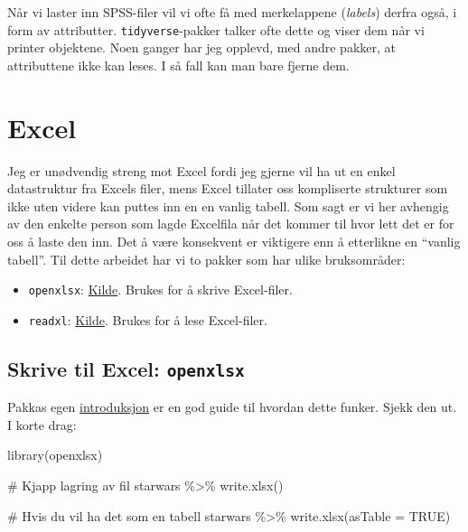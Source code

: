 \documentclass[
  letterpaper,
  DIV=11,
  numbers=noendperiod]{scrreprt}
\newenvironment{Shaded}{\begin{snugshade}}{\end{snugshade}}
\newcommand{\AttributeTok}[1]{\textcolor[rgb]{0.40,0.45,0.13}{#1}}
\newcommand{\CommentTok}[1]{\textcolor[rgb]{0.37,0.37,0.37}{#1}}
\newcommand{\ConstantTok}[1]{\textcolor[rgb]{0.56,0.35,0.01}{#1}}
\newcommand{\FunctionTok}[1]{\textcolor[rgb]{0.28,0.35,0.67}{#1}}
\newcommand{\NormalTok}[1]{\textcolor[rgb]{0.00,0.23,0.31}{#1}}
\newcommand{\SpecialCharTok}[1]{\textcolor[rgb]{0.37,0.37,0.37}{#1}}
\providecommand{\tightlist}{%
  \setlength{\itemsep}{0pt}\setlength{\parskip}{0pt}}\usepackage{longtable,booktabs,array}
\begin{document}
Når vi laster inn SPSS-filer vil vi ofte få med merkelappene
(\emph{labels}) derfra også, i form av attributter.
\texttt{tidyverse}-pakker talker ofte dette og viser dem når vi printer
objektene. Noen ganger har jeg opplevd, med andre pakker, at
attributtene ikke kan leses. I så fall kan man bare fjerne dem.

\hypertarget{excel-1}{%
\section{Excel}\label{excel-1}}

Jeg er unødvendig streng mot Excel fordi jeg gjerne vil ha ut en enkel
datastruktur fra Excels filer, mens Excel tillater oss kompliserte
strukturer som ikke uten videre kan puttes inn en en vanlig tabell. Som
sagt er vi her avhengig av den enkelte person som lagde Excelfila når
det kommer til hvor lett det er for oss å laste den inn. Det å være
konsekvent er viktigere enn å etterlikne en ``vanlig tabell''. Til dette
arbeidet har vi to pakker som har ulike bruksområder:

\begin{itemize}
\tightlist
\item
  \texttt{openxlsx}: \href{https://ycphs.github.io/openxlsx/}{Kilde}.
  Brukes for å skrive Excel-filer.
\item
  \texttt{readxl}: \href{https://readxl.tidyverse.org/}{Kilde}. Brukes
  for å lese Excel-filer.
\end{itemize}

\hypertarget{skrive-til-excel-openxlsx}{%
\subsection{\texorpdfstring{Skrive til Excel:
\texttt{openxlsx}}{Skrive til Excel: openxlsx}}\label{skrive-til-excel-openxlsx}}

Pakkas egen
\href{https://ycphs.github.io/openxlsx/articles/Introduction.html}{introduksjon}
er en god guide til hvordan dette funker. Sjekk den ut. I korte drag:

\begin{Shaded}
\begin{Highlighting}[]
\FunctionTok{library}\NormalTok{(openxlsx)}

\CommentTok{\# Kjapp lagring av fil}
\NormalTok{starwars }\SpecialCharTok{\%\textgreater{}\%} \FunctionTok{write.xlsx}\NormalTok{()}

\CommentTok{\# Hvis du vil ha det som en tabell }
\NormalTok{starwars }\SpecialCharTok{\%\textgreater{}\%} \FunctionTok{write.xlsx}\NormalTok{(}\AttributeTok{asTable =} \ConstantTok{TRUE}\NormalTok{)}
\end{Highlighting}
\end{Shaded}
\end{document}
